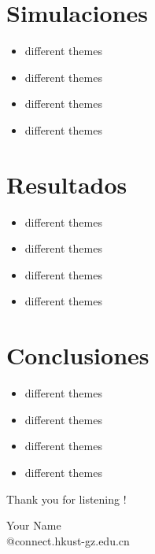 \documentclass[serif, aspectratio=169]{beamer}
\begin{document}
\section{Simulaciones}
\begin{frame}
    \begin{itemize}
        \item different themes
        \item different themes
        \item different themes
        \item different themes
    \end{itemize}
\end{frame}

\section{Resultados}
\begin{frame}
    \begin{itemize}
        \item different themes
        \item different themes
        \item different themes
        \item different themes
    \end{itemize}
\end{frame}

\section{Conclusiones}
\begin{frame}
    \begin{itemize}
        \item different themes
        \item different themes
        \item different themes
        \item different themes
    \end{itemize}
\end{frame}




\begin{frame}
\begin{center}
{ Thank you for listening !}
\vspace{1cm}

Your Name \\[1em]
@connect.hkust-gz.edu.cn 
\end{center}
\end{frame}
\end{document}
